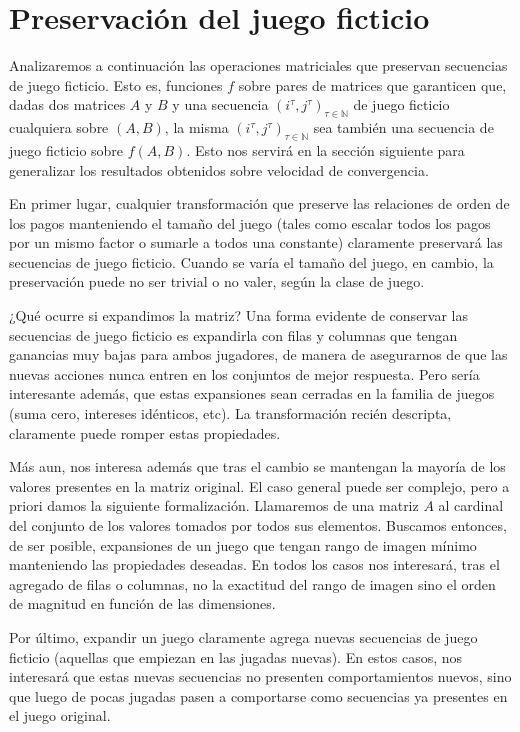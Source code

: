 \section{Preservación del juego ficticio} \label{sec:aportes:preservacion}

Analizaremos a continuación las operaciones matriciales que preservan secuencias de juego ficticio. Esto es, funciones $f$ sobre pares de matrices que garanticen que, dadas dos matrices $A$ y $B$ y una secuencia $(i^\tau, j^\tau)_{\tau \in \mathbb{N}}$ de juego ficticio cualquiera sobre $(A, B)$, la misma $(i^\tau, j^\tau)_{\tau \in \mathbb{N}}$ sea también una secuencia de juego ficticio sobre $f(A, B)$. Esto nos servirá en la sección siguiente para generalizar los resultados obtenidos sobre velocidad de convergencia.

En primer lugar, cualquier transformación que preserve las relaciones de orden de los pagos manteniendo el tamaño del juego (tales como escalar todos los pagos por un mismo factor o sumarle a todos una constante) claramente preservará las secuencias de juego ficticio. Cuando se varía el tamaño del juego, en cambio, la preservación puede no ser trivial o no valer, según la clase de juego.

¿Qué ocurre si expandimos la matriz? Una forma evidente de conservar las secuencias de juego ficticio es expandirla con filas y columnas que tengan ganancias muy bajas para ambos jugadores, de manera de asegurarnos de que las nuevas acciones nunca entren en los conjuntos de mejor respuesta. Pero sería interesante además, que estas expansiones sean cerradas en la familia de juegos (suma cero, intereses idénticos, etc). La transformación recién descripta, claramente puede romper estas propiedades.

Más aun, nos interesa además que tras el cambio se mantengan la mayoría de los valores presentes en la matriz original. El caso general puede ser complejo, pero a priori damos la siguiente formalización. Llamaremos  de una matriz $A$ al cardinal del conjunto de los valores tomados por todos sus elementos. Buscamos entonces, de ser posible, expansiones de un juego que tengan rango de imagen mínimo manteniendo las propiedades deseadas. En todos los casos nos interesará, tras el agregado de filas o columnas, no la exactitud del rango de imagen sino el orden de magnitud en función de las dimensiones.

Por último, expandir un juego claramente agrega nuevas secuencias de juego ficticio (aquellas que empiezan en las jugadas nuevas). En estos casos, nos interesará que estas nuevas secuencias no presenten comportamientos nuevos, sino que luego de pocas jugadas pasen a comportarse como secuencias ya presentes en el juego original.

